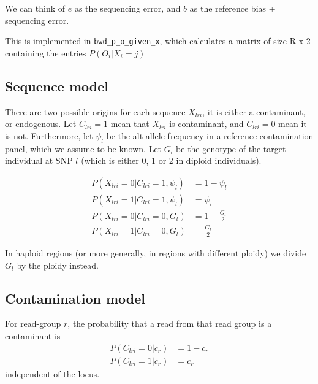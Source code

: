\documentclass[10pt,a4paper]{article}
\begin{document}
We can think of $e$ as the sequencing error, and $b$ as the reference bias + sequencing error.

This is implemented in \texttt{bwd\_p\_o\_given\_x}, which calculates a matrix of size R x 2 containing the entries
$P(O_i | X_i = j)$

\subsection*{Sequence model}

There are two possible origins for each sequence $X_{lri}$, it is either a contaminant, or endogenous. 
Let $C_{lri} =1 $ mean that $X_{lri}$ is contaminant, and $C_{lri} =0 $ mean it is not. Furthermore, let $\psi_l$ be the alt allele frequency in a reference contamination panel, which we assume to be known. Let $G_l$ be the genotype of the target individual at SNP $l$ (which is either 0, 1 or 2 in diploid individuals).


\begin{align}
P(X_{lri} = 0 | C_{lri} = 1, \psi_l) &= 1 - \psi_l\nonumber\\ 
P(X_{lri} = 1 | C_{lri} = 1, \psi_l) &= \psi_l\nonumber\\ 
P(X_{lri} = 0 | C_{lri} = 0, G_l) &= 1 - \frac{G_l}{2}\nonumber\\ 
P(X_{lri} = 1 | C_{lri} = 0, G_l) &= \frac{G_l}{2}
\end{align}

In haploid regions (or more generally, in regions with different ploidy) we divide $G_l$ by the ploidy instead.



\subsection*{Contamination model}
For read-group $r$, the probability that a read from that read group is a contaminant is 
\begin{align}
P(C_{lri} = 0 | c_r) &= 1-c_r\nonumber\\
P(C_{lri} = 1 | c_r) &= c_r
\end{align}
independent of the locus.
\end{document}
